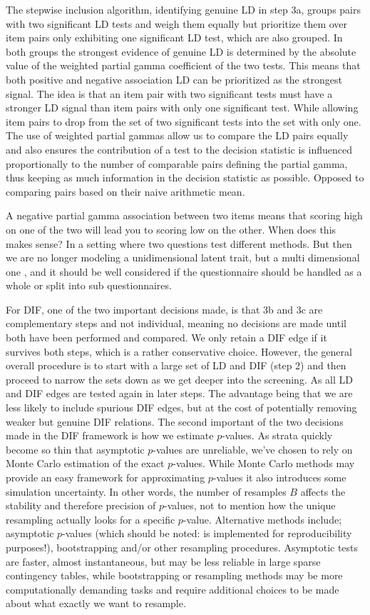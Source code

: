 \documentclass[a4project,12pt]{article}
\theoremstyle{examplestyle}
\theoremstyle{defstyle}
\theoremstyle{thmstyle}
\begin{document}
The stepwise inclusion algorithm, identifying genuine LD in step 3a, groups pairs with two significant LD tests and weigh them equally but prioritize them over item pairs only exhibiting one significant LD test, which are also grouped. In both groups the strongest evidence of genuine LD is determined by the absolute value of the weighted partial gamma coefficient of the two tests. This means that both positive and negative association LD can be prioritized as the strongest signal. The idea is that an item pair with two significant tests must have a stronger LD signal than item pairs with only one significant test. While allowing item pairs to drop from the set of two significant tests into the set with only one. The use of weighted partial gammas allow us to compare the LD pairs equally and also ensures the contribution of a test to the decision statistic is influenced proportionally to the number of comparable pairs defining the partial gamma, thus keeping as much information in the decision statistic as possible. Opposed to comparing pairs based on their naive arithmetic mean. 

A negative partial gamma association between two items means that scoring high on one of the two will lead you to scoring low on the other. When does this makes sense? In a setting where two questions test different methods. But then we are no longer modeling a unidimensional latent trait, but a multi dimensional one \cite{kreiner-christensen-2004}, and it should be well considered if the questionnaire should be handled as a whole or split into sub questionnaires.  


For DIF, one of the two important decisions made, is that 3b and 3c are complementary steps and not individual, meaning no decisions are made until both have been performed and compared. We only retain a DIF edge if it survives both steps, which is a rather conservative choice. However, the general overall procedure is to start with a large set of LD and DIF (step 2) and then proceed to narrow the sets down as we get deeper into the screening. As all LD and DIF edges are tested again in later steps. The advantage being that we are less likely to include spurious DIF edges, but at the cost of potentially removing weaker but genuine DIF relations. The second important of the two decisions made in the DIF framework is how we estimate $p$-values. As strata quickly become so thin that asymptotic $p$-values are unreliable, we've chosen to rely on Monte Carlo estimation of the exact $p$-values. While Monte Carlo methods may provide an easy framework for approximating $p$-values it also introduces some simulation uncertainty. In other words, the number of resamples $B$ affects the stability and therefore precision of $p$-values, not to mention how the unique resampling actually looks for a specific $p$-value. Alternative methods include; asymptotic $p$-values (which should be noted: is implemented for reproducibility purposes!), bootstrapping and/or other resampling procedures. Asymptotic tests are faster, almost instantaneous, but may be less reliable in large sparse contingency tables, while bootstrapping or resampling methods may be more computationally demanding tasks and require additional choices to be made about what exactly we want to resample. 
\end{document}

